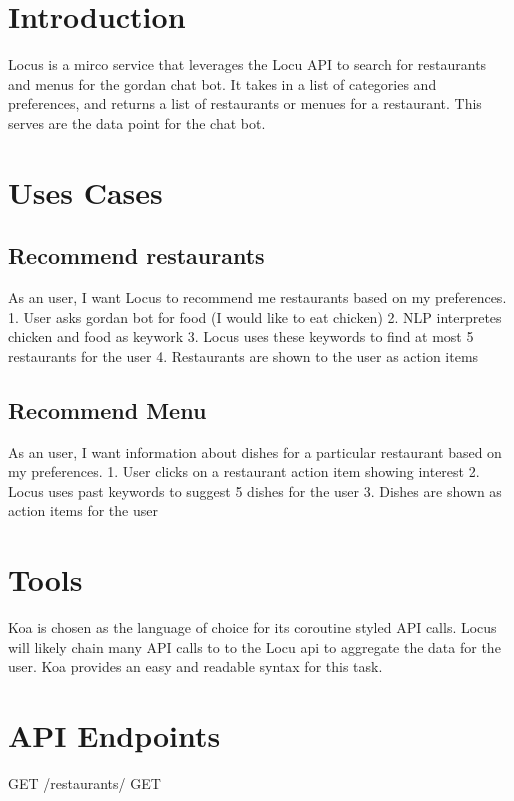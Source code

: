 \section{Introduction}
Locus is a mirco service that leverages the Locu API to search for restaurants and menus for the gordan chat bot. It takes in a list of categories and preferences, and returns a list of restaurants or menues for a restaurant. This serves are the data point for the chat bot.

\section{Uses Cases}
\subsection{Recommend restaurants}
As an user, I want Locus to recommend me restaurants based on my preferences.
1. User asks gordan bot for food (I would like to eat chicken)
2. NLP interpretes chicken and food as keywork
3. Locus uses these keywords to find at most 5 restaurants for the user
4. Restaurants are shown to the user as action items

\subsection{Recommend Menu}
As an user, I want information about dishes for a particular restaurant based on my preferences.
1. User clicks on a restaurant action item showing interest
2. Locus uses past keywords to suggest 5 dishes for the user
3. Dishes are shown as action items for the user

\section{Tools}
Koa is chosen as the language of choice for its coroutine styled API calls. Locus will likely chain many API calls to to the Locu api to aggregate the data for the user. Koa provides an easy and readable syntax for this task.

\section{API Endpoints}
GET /restaurants/
GET


